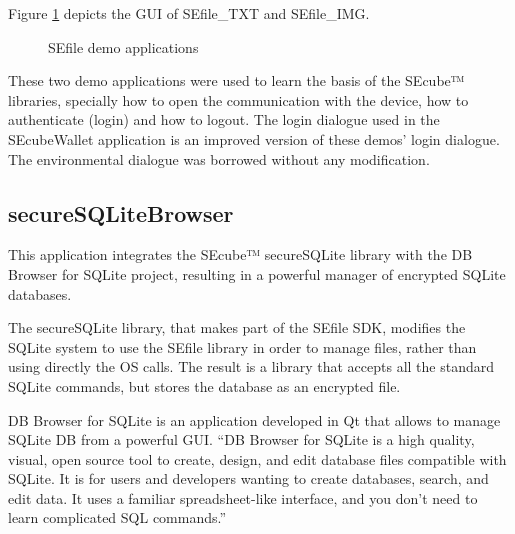 Figure \ref{fig:sefiledem} depicts the GUI of SEfile\_TXT and SEfile\_IMG.

\begin{figure}[ht]
  \centering
  {}
  \caption{SEfile demo applications}
 \label{fig:sefiledem}
\end{figure}

These two demo applications were used to learn the basis of the SEcube™ libraries, specially how to open the communication with the device, how to authenticate (login) and how to logout. The login dialogue used in the SEcubeWallet application is an improved version of these demos' login dialogue. The environmental dialogue was borrowed without any modification.

\subsection{secureSQLiteBrowser}

This application integrates the SEcube™ secureSQLite library with the DB Browser for SQLite \cite{SQLitebro} project, resulting in a powerful manager of encrypted SQLite databases.

The secureSQLite library, that makes part of the SEfile SDK, modifies the SQLite system to use the SEfile library in order to manage files, rather than using directly the OS calls. The result is a library that accepts all the standard SQLite commands, but stores the database as an encrypted file.

DB Browser for SQLite is an application developed in Qt that allows to manage SQLite DB from a powerful GUI. ``DB Browser for SQLite is a high quality, visual, open source tool to create, design, and edit database files compatible with SQLite. It is for users and developers wanting to create databases, search, and edit data. It uses a familiar spreadsheet-like interface, and you don't need to learn complicated SQL commands.'' \cite{SQLitebro}

